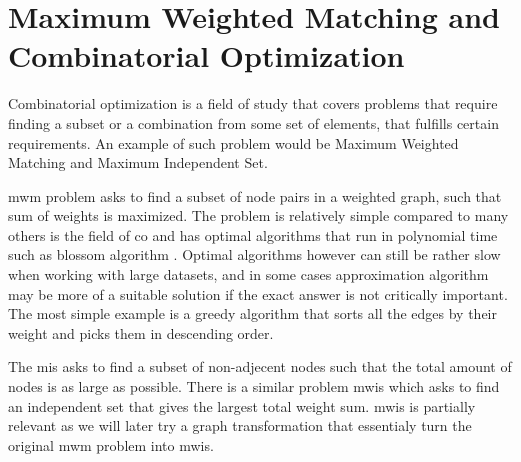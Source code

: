 \section{Maximum Weighted Matching and Combinatorial Optimization}

Combinatorial optimization is a field of study that covers problems that require finding a subset or a combination from some set of elements, that fulfills certain requirements. An example of such problem would be Maximum Weighted Matching and Maximum Independent Set. 

\gls{mwm} problem asks to find a subset of node pairs in a weighted graph, such that sum of weights is maximized. The problem is relatively simple compared to many others is the field of \gls{co} and has optimal algorithms that run in polynomial time such as blossom algorithm \cite{blossom}. Optimal algorithms however can still be rather slow when working with large datasets, and in some cases approximation algorithm may be more of a suitable solution if the exact answer is not critically important. The most simple example is a greedy algorithm that sorts all the edges by their weight and picks them in descending order.

The \gls{mis} asks to find a subset of non-adjecent nodes such that the total amount of nodes is as large as possible. There is a similar problem \gls{mwis} which asks to find an independent set that gives the largest total weight sum. \gls{mwis} is partially relevant as we will later try a graph transformation that essentialy turn the original \gls{mwm} problem into \gls{mwis}.

